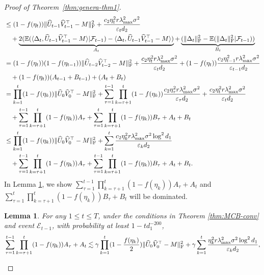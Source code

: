 \documentclass[12pt]{article}
\newcommand\fro[1]{\| #1 \|_{\rm{F}}}
\newcommand{\inp}[2]{\langle #1,#2\rangle}
\def\EE{{\mathbb E}}
\newtheorem{Lemma}{Lemma}
\theoremstyle{plain}
\begin{document}
\begin{proof}[Proof of Theorem~\ref{thm:genera-thm1}]
\begin{align*}
        & \leq (1-f(\eta_t))\fro{\widehat{U}_{t-1}\widehat{V}_{t-1}^{\top} - M}^2 + \frac{c_2\eta_t^2r\lambda_{\max}^2\sigma^2}{\varepsilon_td_2}  \\
        &\quad + \underbrace{2(\EE(\inp{\Delta_t}{\widehat{U}_{t-1}\widehat{V}_{t-1}^{\top}-M}|\mathcal{F}_{t-1}) -\inp{\Delta_t}{\widehat{U}_{t-1}\widehat{V}_{t-1}^{\top}-M})}_{A_{t}} +\underbrace{(\fro{\Delta_t}^2 - \EE(\fro{\Delta_t}^2|\mathcal{F}_{t-1}))}_{B_{t}} \\
        &= (1-f(\eta_t))(1-f(\eta_{t-1})) \fro{\widehat{U}_{t-2}\widehat{V}_{t-2}^{\top} - M}^2 + \frac{c_2\eta_t^2r\lambda_{\max}^2\sigma^2}{\varepsilon_td_2} + (1-f(\eta_{t}))\frac{c_2\eta_{t-1}^2r\lambda_{\max}^2\sigma^2}{\varepsilon_{t-1}d_2} \\
        &\quad + (1-f(\eta_t))(A_{t-1}+B_{t-1})+(A_{t}+B_{t}) \\
        &= \prod_{k=1}^{t}(1-f(\eta_k)) \fro{\widehat{U}_{0}\widehat{V}_{0}^{\top} - M}^2 + \sum_{\tau=1}^{t-1}\prod_{k=\tau+1}^{t}(1-f(\eta_k))\frac{c_2\eta_{\tau}^2r\lambda_{\max}^2\sigma^2}{\varepsilon_{\tau}d_2} + \frac{c_2\eta_t^2r\lambda_{\max}^2\sigma^2}{\varepsilon_td_2}  \\
        &\quad + \sum_{\tau=1}^{t-1}\prod_{k=\tau+1}^{t} (1-f(\eta_k))A_{\tau} + \sum_{\tau=1}^{t}\prod_{k=\tau+1}^{t} (1-f(\eta_k))B_{\tau} + A_{t} + B_{t} \\
        &\leq \prod_{k=1}^{t}(1-f(\eta_k)) \fro{\widehat{U}_{0}\widehat{V}_{0}^{\top} - M}^2 + \sum_{k=1}^{t}\frac{c_2\eta_k^2r\lambda_{\max}^2\sigma^2\log^2d_1}{\varepsilon_kd_2} \\
        &\quad + \sum_{\tau=1}^{t-1}\prod_{k=\tau+1}^{t} (1-f(\eta_k))A_{\tau} + \sum_{\tau=1}^{t-1}\prod_{k=\tau+1}^{t} (1-f(\eta_k))B_{\tau} + A_{t} + B_{t}. 
    \end{align*}
    In Lemma \ref{lemmafro}, we show $\sum_{\tau=1}^{t-1}\prod_{k=\tau+1}^{t} (1-f(\eta_k))A_{\tau}+A_t$ and $\sum_{\tau=1}^{t}\prod_{k=\tau+1}^{t} (1-f(\eta_k))B_{\tau}+B_{t}$ will be dominated.
    \begin{Lemma}
        \label{lemmafro} For any $1\leq t\leq T$, under the conditions in Theorem \ref{thm:MCB-conv} and event $\mathcal{E}_{t-1}$, with probability at least $1-td_1^{-200}$,
        \begin{align*}
            &\sum_{\tau=1}^{t-1}\prod_{k=\tau+1}^{t} (1-f(\eta_k))A_{\tau}+A_t\lesssim \gamma\prod_{k=1}^{t}(1-\frac{f(\eta_k)}{2}) \fro{\widehat{U}_{0}\widehat{V}_{0}^{\top} - M}^2 + \gamma\sum_{k=1}^{t}\frac{\eta_k^2r\lambda_{\max}^2\sigma^2\log^2d_1}{\varepsilon_kd_2}, \\

\end{align*}
\end{Lemma}
\end{proof}
\end{document}
